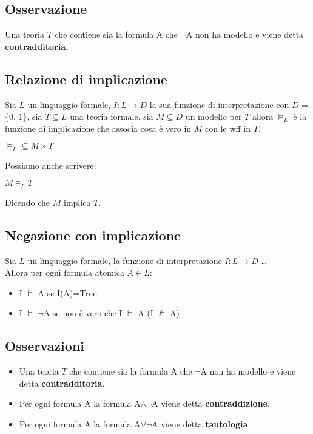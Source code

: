 \documentclass[../main.tex]{subfiles}
\begin{document}
    \subsection{Osservazione}
    Una teoria $T$ che contiene sia la formula A che $\lnot$A non ha modello e viene detta \textbf{contradditoria}.

    \subsection{Relazione di implicazione}
    Sia $L$ un linguaggio formale, $I:L \to D$ la sua funzione di interpretazione con $D$ = \{0, 1\}, sia $T \subseteq L$ una teoria formale, sia $M \subseteq D$ un modello per $T$ allora $\models_L$ è la funzione di implicazione che associa cosa è vero in $M$ con le wff in $T$.
    \begin{center}
        $\models_L \subseteq M \times T$
    \end{center}
    Possiamo anche scrivere:
    \begin{center}
        $M \models_L T$
    \end{center}
    Dicendo che $M$ implica $T$.

    \subsection{Negazione con implicazione}
    Sia $L$ un linguaggio formale, la funzione di interpretazione $I:L \to D$ \dots\\
    Allora per ogni formula atomica $A \in L$:
    \begin{itemize}
        \item I $\models$ A se I(A)=True
        \item I $\models$ $\lnot$A se non è vero che I $\models$ A (I $\not\models$ A)
    \end{itemize}

    \subsection{Osservazioni}
    \begin{itemize}
        \item Una teoria $T$ che contiene sia la formula A che $\lnot$A non ha modello e viene detta \textbf{contradditoria}.
        \item Per ogni formula A la formula A$\land \lnot$A viene detta \textbf{contraddizione}.
        \item Per ogni formula A la formula A$\lor \lnot$A viene detta \textbf{tautologia}.
    \end{itemize}
\end{document}
